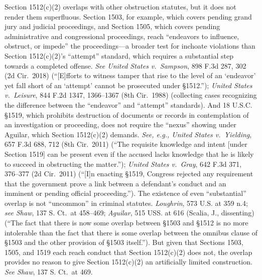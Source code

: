 Section 1512(c)(2) overlaps with other obstruction statutes, but it does not render them superfluous.
Section 1503, for example, which covers pending grand jury and judicial proceedings, and Section 1505, which covers pending administrative and congressional proceedings, reach “endeavors to influence, obstruct, or impede” the proceedings---a broader test for inchoate violations than Section 1512(c)(2)’s “attempt” standard, which requires a substantial step towards a completed offense.
\textit{See United States v.\ Sampson}, 898 F.3d 287, 302 (2d Cir.~2018) (“[E]fforts to witness tamper that rise to the level of an ‘endeavor’ yet fall short of an ‘attempt’ cannot be prosecuted under \S 1512.”);
\textit{United States v.\ Leisure}, 844 F.2d 1347, 1366--1367 (8th Cir.~1988) (collecting cases recognizing the difference between the “endeavor” and “attempt” standards).
And 18 U.S.C. \S 1519, which prohibits destruction of documents or records in contemplation of an investigation or proceeding, does not require the “nexus” showing under Aguilar, which Section 1512(c)(2) demands.
\textit{See, e.g., United States v.\ Yielding}, 657 F.3d 688, 712 (8th Cir.~2011) (“The requisite knowledge and intent [under Section 1519] can be present even if the accused lacks knowledge that he is likely to succeed in obstructing the matter.”);
\textit{United States v.\ Gray}, 642 F.3d 371, 376--377 (2d Cir.~2011) (“[I]n enacting \S 1519, Congress rejected any requirement that the government prove a link between a defendant’s conduct and an imminent or pending official proceeding.”).
The existence of even “substantial” overlap is not “uncommon” in criminal statutes.
\textit{Loughrin}, 573 U.S. at 359 n.4;
\textit{see Shaw}, 137 S. Ct.~at 458--469;
\textit{Aguilar}, 515 USS. at 616 (Scalia, J., dissenting) (“The fact that there is now some overlap between \S 1503 and \S 1512 is no more intolerable than the fact that there is some overlap between the omnibus clause of \S 1503 and the other provision of \S 1503 itself.”).
But given that Sections 1503, 1505, and 1519 each reach conduct that Section 1512(c)(2) does not, the overlap provides no reason to give Section 1512(c)(2) an artificially limited construction.
\textit{See Shaw}, 137 S. Ct.~at 469.%
